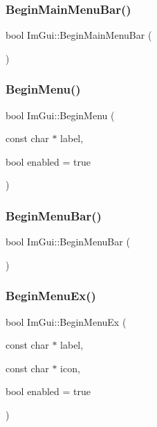 \subsubsection{\texorpdfstring{Begin\+Main\+Menu\+Bar()}{BeginMainMenuBar()}}
{\footnotesize\ttfamily bool Im\+Gui\+::\+Begin\+Main\+Menu\+Bar (\begin{DoxyParamCaption}{ }\end{DoxyParamCaption})}

\mbox{\label{namespaceImGui_a1e55711a21f97d5dff919d697d3a7201}} 
\subsubsection{\texorpdfstring{Begin\+Menu()}{BeginMenu()}}
{\footnotesize\ttfamily bool Im\+Gui\+::\+Begin\+Menu (\begin{DoxyParamCaption}\item[{const char $\ast$}]{label,  }\item[{bool}]{enabled = {\ttfamily true} }\end{DoxyParamCaption})}

\mbox{\label{namespaceImGui_a4852dff802922163fc747e2e0df5b88f}} 
\subsubsection{\texorpdfstring{Begin\+Menu\+Bar()}{BeginMenuBar()}}
{\footnotesize\ttfamily bool Im\+Gui\+::\+Begin\+Menu\+Bar (\begin{DoxyParamCaption}{ }\end{DoxyParamCaption})}

\mbox{\label{namespaceImGui_a8dc671f87ed281b6445ce6ae4ab25183}} 
\subsubsection{\texorpdfstring{Begin\+Menu\+Ex()}{BeginMenuEx()}}
{\footnotesize\ttfamily bool Im\+Gui\+::\+Begin\+Menu\+Ex (\begin{DoxyParamCaption}\item[{const char $\ast$}]{label,  }\item[{const char $\ast$}]{icon,  }\item[{bool}]{enabled = {\ttfamily true} }\end{DoxyParamCaption})}

